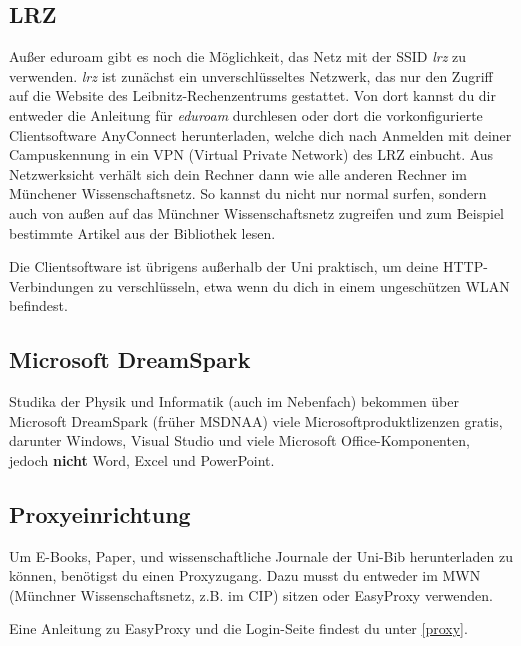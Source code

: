 \subsection*{LRZ}
Außer eduroam gibt es noch die Möglichkeit, das Netz mit der SSID
\emph{lrz} zu verwenden. \emph{lrz} ist zunächst ein unverschlüsseltes
Netzwerk, das nur den Zugriff auf die Website des
Leibnitz-Rechenzentrums gestattet. Von dort kannst du dir entweder die 
Anleitung für \emph{eduroam} durchlesen oder dort die
vorkonfigurierte Clientsoftware AnyConnect herunterladen, welche dich
nach Anmelden mit deiner Campuskennung in ein VPN (Virtual Private
Network) des LRZ einbucht. Aus Netzwerksicht verhält sich dein Rechner
dann wie alle anderen Rechner im Münchener Wissenschaftsnetz. So
kannst du nicht nur normal surfen, sondern auch von außen auf das
Münchner Wissenschaftsnetz zugreifen und zum Beispiel bestimmte
Artikel aus der Bibliothek lesen.

Die Clientsoftware ist übrigens außerhalb der Uni praktisch, um deine
HTTP-Verbindungen zu verschlüsseln, etwa wenn du dich in einem
ungeschützen WLAN befindest.

\subsection*{Microsoft DreamSpark \subjectList{\subjectMI{}\subjectI{}\subjectP{}}}
Studika der Physik und Informatik (auch im Nebenfach) bekommen über
Microsoft DreamSpark (früher MSDNAA) viele Microsoftproduktlizenzen
gratis, darunter Windows, Visual Studio und viele
Microsoft Office-Komponenten, jedoch \textbf{nicht} Word, Excel und PowerPoint.

\begin{urlList}
\end{urlList}

\subsection*{Proxyeinrichtung}
Um E-Books, Paper, und wissenschaftliche Journale der Uni-Bib
herunterladen zu können, benötigst du einen Proxyzugang. Dazu musst du
entweder im MWN (Münchner Wissenschaftsnetz, z.B. im CIP) sitzen oder
EasyProxy verwenden. 

Eine Anleitung zu EasyProxy und die Login-Seite findest du unter \ref{proxy}.

\begin{urlList}
\end{urlList}
